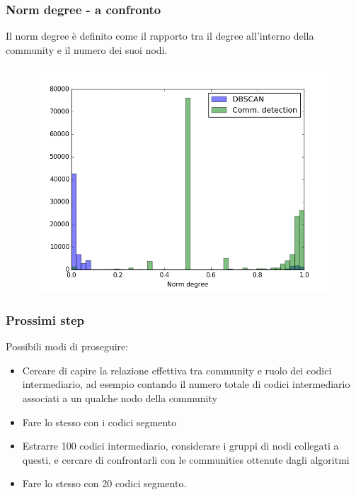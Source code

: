 \documentclass{beamer}
\begin{document}
\begin{frame}
 \frametitle{Norm degree - a confronto}
 Il norm degree è definito come il rapporto tra il degree all'interno della community e il numero dei suoi nodi.
  \begin{figure}[htbp]
\centering
\includegraphics[height=6.0 cm,width=10 cm]{plot_ndegree.png}

\end{figure}
\end{frame}
\begin{frame}
\frametitle{Prossimi step}
Possibili modi di proseguire:
\begin{itemize}
\item Cercare di capire la relazione effettiva tra community e ruolo dei codici intermediario, ad esempio contando il numero totale di codici intermediario associati a un qualche nodo della community
\item Fare lo stesso con i codici segmento
\item Estrarre 100 codici intermediario, considerare i gruppi di nodi collegati a questi, e cercare di confrontarli con le communities ottenute dagli algoritmi
\item Fare lo stesso con 20 codici segmento.
\end{itemize}
\end{frame}
\end{document}
